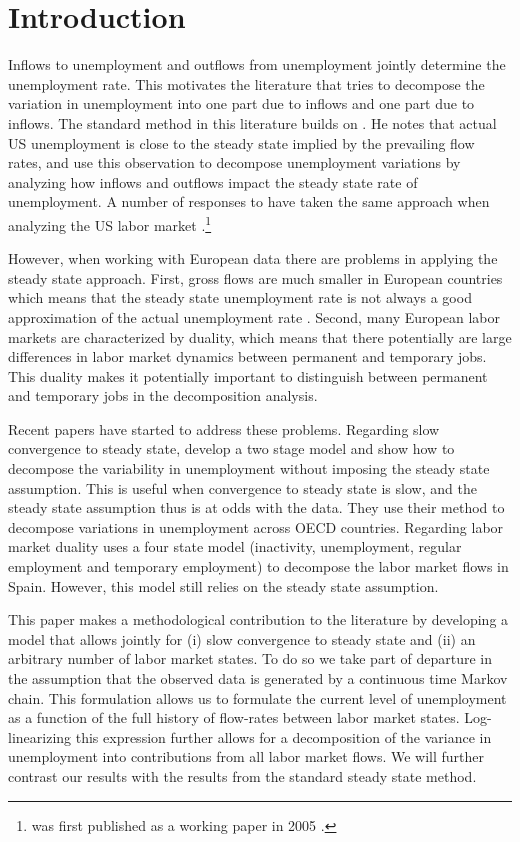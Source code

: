 \section{Introduction}
\label{sec:intro}

Inflows to unemployment and outflows from unemployment jointly determine the unemployment rate. This motivates the literature that tries to decompose the variation in unemployment into one part due to inflows and one part due to inflows. The standard method in this literature builds on \cite{Shimer2012}. He notes that actual US unemployment is close to the steady state implied by the prevailing flow rates, and use this observation to decompose unemployment variations by analyzing how inflows and outflows impact the steady state rate of unemployment. A number of responses to \cite{Shimer2012} have taken the same approach when analyzing the US labor market \cite{Fujita2009, Elsby2009b}.\footnote{\cite{Shimer2012} was first published as a working paper in 2005 \cite{Shimer2005b}.}

However, when working with European data there are problems in applying the steady state approach. First, gross flows are much smaller in European countries which means that the steady state unemployment rate is not always a good approximation of the actual unemployment rate \citep{Elsby2013}. Second, many European labor markets are characterized by duality, which means that there potentially are large differences in labor market dynamics between permanent and temporary jobs. This 
duality makes it potentially important to distinguish between permanent and temporary jobs in the decomposition analysis. 

Recent papers have started to address these problems. Regarding slow convergence to steady state, \citep{Elsby2013} develop a two stage model and show how to decompose the variability in unemployment without imposing the steady state assumption. This is useful when convergence to steady state is slow, and the steady state assumption thus is at odds with the data. They use their method to decompose variations in unemployment across OECD countries. Regarding labor market duality \cite{Silva2013} uses a four state model (inactivity, unemployment, regular employment and temporary employment) to decompose the labor market flows in Spain. However, this model still relies on the steady state assumption. 

This paper makes a methodological contribution to the literature by developing a model that allows jointly for (i) slow convergence to steady state and (ii) an arbitrary number of labor market states. To do so we take part of departure in the assumption that the observed data is generated by a continuous time Markov chain. This formulation allows us to formulate the current level of unemployment as a function of the full history of flow-rates between labor market states. Log-linearizing this expression further allows for a decomposition of the variance in unemployment into contributions from all labor market flows. We will further contrast our results with the results from the standard steady state method.

